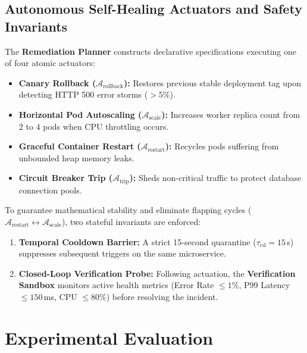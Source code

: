 \documentclass[conference]{IEEEtran}
\begin{document}
\subsection{Autonomous Self-Healing Actuators and Safety Invariants}
The \textbf{Remediation Planner} constructs declarative specifications executing one of four atomic actuators:
\begin{itemize}
    \item \textbf{Canary Rollback ($\mathcal{A}_{\text{rollback}}$):} Restores previous stable deployment tag upon detecting HTTP 500 error storms ($>5\%$).
    \item \textbf{Horizontal Pod Autoscaling ($\mathcal{A}_{\text{scale}}$):} Increases worker replica count from $2$ to $4$ pods when CPU throttling occurs.
    \item \textbf{Graceful Container Restart ($\mathcal{A}_{\text{restart}}$):} Recycles pods suffering from unbounded heap memory leaks.
    \item \textbf{Circuit Breaker Trip ($\mathcal{A}_{\text{trip}}$):} Sheds non-critical traffic to protect database connection pools.
\end{itemize}
To guarantee mathematical stability and eliminate flapping cycles ($\mathcal{A}_{\text{restart}} \leftrightarrow \mathcal{A}_{\text{scale}}$), two stateful invariants are enforced:
\begin{enumerate}
    \item \textbf{Temporal Cooldown Barrier:} A strict 15-second quarantine ($\tau_{\text{cd}} = 15$\,s) suppresses subsequent triggers on the same microservice.
    \item \textbf{Closed-Loop Verification Probe:} Following actuation, the \textbf{Verification Sandbox} monitors active health metrics (Error Rate $\le 1\%$, P99 Latency $\le 150$\,ms, CPU $\le 80\%$) before resolving the incident.
\end{enumerate}

\section{Experimental Evaluation}
\end{document}
